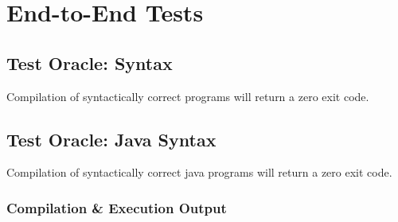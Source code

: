 \documentclass[12pt]{book}
\begin{document}

    \section{End-to-End Tests}


    \subsection{Test Oracle: Syntax} Compilation of syntactically correct programs will return a zero exit code.\\
    \subsection{Test Oracle: Java Syntax} Compilation of syntactically correct java programs will return a zero exit code.\\

    \subsubsection{Compilation \& Execution Output}
\end{document}
